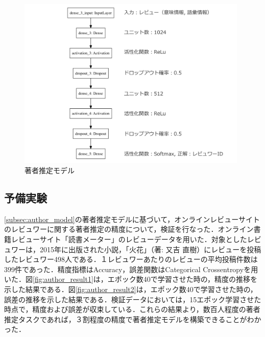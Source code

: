 \documentclass[a4paper,11pt,oneside,openany]{jsbook}
\begin{document}
\begin{figure}[htb]
	\begin{center} %
		\includegraphics [width = 110mm] {figures/author_model.pdf} %
	\end{center}
	\caption{著者推定モデル} %
	\label{fig:author_model} %
\end{figure}

\subsection{予備実験}
\ref{subsec:author_model}の著者推定モデルに基づいて，オンラインレビューサイトのレビュワーに関する著者推定の精度について，検証を行なった．オンライン書籍レビューサイト「読書メーター」のレビューデータを用いた．対象としたレビュワーは，2015年に出版された小説，「火花」（著: 又吉 直樹）にレビューを投稿したレビュワー498人である．１レビュワーあたりのレビューの平均投稿件数は399件であった．精度指標はAccuracy，誤差関数はCategorical Crossentropyを用いた．図\ref{fig:author_result1}は，エポック数40で学習させた時の，精度の推移を示した結果である．図\ref{fig:author_result2}は，エポック数40で学習させた時の，誤差の推移を示した結果である．検証データにおいては，15エポック学習させた時点で，精度および誤差が収束している．これらの結果より，数百人程度の著者推定タスクであれば，３割程度の精度で著者推定モデルを構築できることがわかった．
\end{document}
